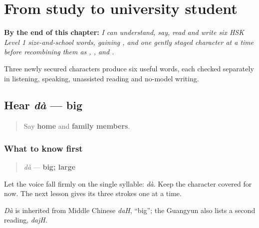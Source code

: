 
\chapter{From study to university student}
\label{ch:zh-school-six}

\begin{chapteropening}
\textbf{By the end of this chapter:} \emph{I can understand, say, read and write six HSK Level 1 size-and-school words, gaining ,  and  one gently staged character at a time before recombining them as , ,  and .}

Three newly secured characters produce six useful words, each checked separately in listening, speaking, unassisted reading and no-model writing.
\end{chapteropening}

\section[dà]{Hear \emph{dà} — big}

\label{lesson:ZH-C13-hear-da}



\begin{quote}
Say \textbf{home} and \textbf{family members}.
\end{quote}

\subsection*{What to know first}
\begin{quote}
\emph{dà} — \textbf{big; large}
\end{quote}

Let the voice fall firmly on the single syllable: \emph{dà}. Keep the character covered for now. The next lesson gives its three strokes one at a time.

\emph{Dà} is inherited from Middle Chinese \emph{daH}, \textquotedblleft{}big\textquotedblright{}; the Guangyun also lists a second reading, \emph{dajH}.

